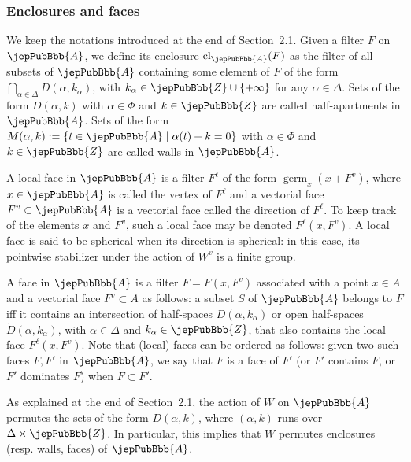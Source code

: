 \subsubsection{Enclosures and faces}
We keep the notations introduced at the end of Section~2.1. Given a filter $F$ on $\jepPubBbb{A}$, we define its enclosure $\operatorname{cl}_{\jepPubBbb{A}}(F)$ as the filter of all subsets of $\jepPubBbb{A}$ containing some element of $F$ of the form $\bigcap_{\alpha\in\Delta}D(\alpha,k_\alpha)$, with $k_\alpha\in\jepPubBbb{Z}\cup\{+\infty\}$ for any $\alpha\in\Delta$. Sets of the form $D(\alpha,k)$ with $\alpha\in\Phi$ and $k\in\jepPubBbb{Z}$ are called half-apartments in $\jepPubBbb{A}$. Sets of the form $M(\alpha,k):=\{t\in\jepPubBbb{A}\mid\alpha(t)+k=0\}$ with $\alpha\in\Phi$ and $k\in\jepPubBbb{Z}$ are called walls in $\jepPubBbb{A}$.

A local face in $\jepPubBbb{A}$ is a filter $F^\ell$ of the form $\operatorname{germ}_x(x+F^v)$, where $x\in\jepPubBbb{A}$ is called the vertex of $F^\ell$ and a vectorial face $F^v\subset\jepPubBbb{A}$ is a vectorial face called the direction of $F^\ell$. To keep track of the elements $x$ and $F^v$, such a local face may be denoted $F^\ell(x,F^v)$. A local face is said to be spherical when its direction is spherical: in this case, its pointwise stabilizer under the action of $W^v$ is a finite group.

A face in $\jepPubBbb{A}$ is a filter $F=F(x,F^v)$ associated with a point $x\in A$ and a vectorial face $F^v\subset A$ as follows: a subset $S$ of $\jepPubBbb{A}$ belongs to $F$ iff it contains an intersection of half-spaces $D(\alpha,k_\alpha)$ or open half-spaces $\mathring{D}(\alpha,k_\alpha)$, with $\alpha\in\Delta$ and $k_\alpha\in\jepPubBbb{Z}$, that also contains the local face $F^\ell(x,F^v)$. Note that (local) faces can be ordered as follows: given two such faces $F,F'$ in $\jepPubBbb{A}$, we say that $F$ is a face of $F'$ (or $F'$ contains $F$, or $F'$ dominates $F$) when $F\subset F'$.

As explained at the end of Section~2.1, the action of $W$ on $\jepPubBbb{A}$ permutes the sets of the form $D(\alpha,k)$, where $(\alpha,k)$ runs over $\Delta\times\jepPubBbb{Z}$. In particular, this implies that $W$ permutes enclosures (resp. walls, faces) of $\jepPubBbb{A}$.

